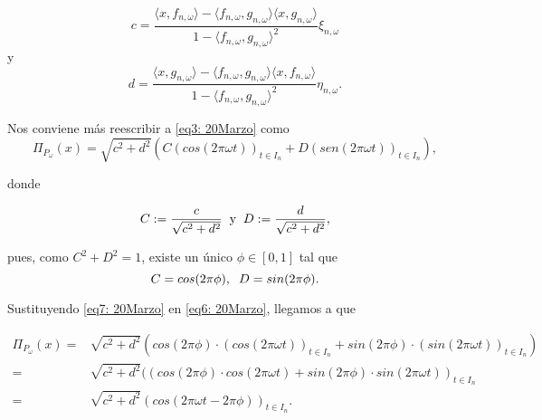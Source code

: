\begin{equation}
\label{eq4: 20Marzo}
c= \frac{
\langle x, f_{n, \omega} \rangle - \langle f_{n, \omega}, g_{n, \omega} \rangle
\langle x, g_{n, \omega} \rangle
}{1-\langle f_{n, \omega}, g_{n, \omega} \rangle^{2}} \xi_{n, \omega}
\end{equation}
y
\begin{equation}
\label{eq5: 20Marzo}
d= \frac{
\langle x, g_{n, \omega} \rangle - \langle f_{n, \omega}, g_{n, \omega} \rangle
\langle x, f_{n, \omega} \rangle
}{1-\langle f_{n, \omega}, g_{n, \omega} \rangle^{2}} \eta_{n, \omega}.
\end{equation}

\noindent 
Nos conviene más reescribir a \eqref{eq3: 20Marzo} como
\begin{equation}
\label{eq6: 20Marzo}
\Pi_{P_{\omega}}(x)= 
\sqrt{c^{2}+d^{2}}
\left(
C (cos (2 \pi \omega t))_{t \in I_{n}} +
D (sen (2 \pi \omega t))_{t \in I_{n}} 
\right),
\end{equation}

\noindent 
donde

\begin{equation}
\label{eq3: 28Marz23}
C:= \frac{c}{\sqrt{c^{2}+d^{2}}} \hspace{0.2cm} \text{y}
\hspace{0.2cm} D:= \frac{d}{\sqrt{c^{2}+d^{2}}},
\end{equation}

pues, como $C^{2} + D^{2}=1$, existe un único
$\phi \in [0,1]$ tal que
\begin{equation}
\label{eq7: 20Marzo}
C= cos(2 \pi \phi), \hspace{0.2cm} 
D= sin(2 \pi \phi).
\end{equation}

\noindent 
Sustituyendo \eqref{eq7: 20Marzo} en \eqref{eq6: 20Marzo},
llegamos a que

\begin{align*}
\Pi_{P_{\omega}}(x) = & 
\sqrt{c^{2}+d^{2}} \left(
cos(2 \pi \phi) \cdot (cos (2 \pi \omega t))_{t \in I_{n}} +
sin(2 \pi \phi) \cdot (sin (2 \pi \omega t))_{t \in I_{n}} 
\right) \\
= & 
\sqrt{c^{2}+d^{2}} 
((cos(2 \pi \phi) \cdot cos (2 \pi \omega t) +
sin(2 \pi \phi) \cdot sin (2 \pi \omega t) )_{t \in I_{n}} \\
= & 
\sqrt{c^{2}+d^{2}} 
(cos(2 \pi \omega t - 2 \pi \phi))_{t \in I_{n}}.
\end{align*}

